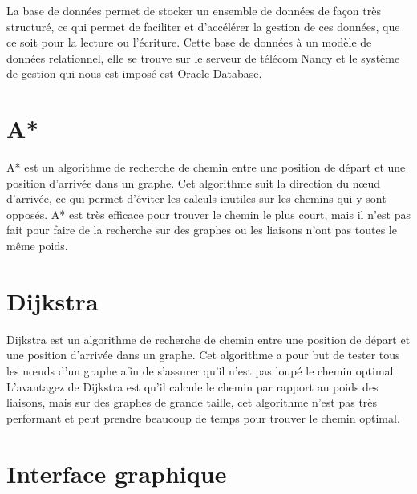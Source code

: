 \documentclass{article}
\begin{document}
La base de données permet de stocker un ensemble de données de façon très structuré, ce qui permet de faciliter et d’accélérer la gestion de ces données, que ce soit pour la lecture ou l’écriture. Cette base de données à un modèle de données relationnel, elle se trouve sur le serveur de télécom Nancy et le système de gestion qui nous est imposé est Oracle Database.


\section{A*}

A* est un algorithme de recherche de chemin entre une position de départ et une position d’arrivée dans un graphe. Cet algorithme suit la direction du nœud d’arrivée, ce qui permet d’éviter les calculs inutiles sur les chemins qui y sont opposés. A* est très efficace pour trouver le chemin le plus court, mais il n’est pas fait pour faire de la recherche sur des graphes ou les liaisons n’ont pas toutes le même poids.  


\section{Dijkstra}

Dijkstra est un algorithme de recherche de chemin entre une position de départ et une position d’arrivée dans un graphe. Cet algorithme a pour but de tester tous les nœuds d’un graphe afin de s’assurer qu’il n’est pas loupé le chemin optimal. L’avantagez de Dijkstra est qu’il calcule le chemin par rapport au poids des liaisons, mais sur des graphes de grande taille, cet algorithme n’est pas très performant et peut prendre beaucoup de temps pour trouver le chemin optimal.


\section{Interface graphique}

\end{document}
